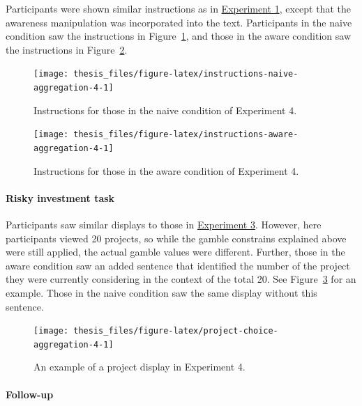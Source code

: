 \documentclass[a4paper, nobind, dvipsnames]{templates/ociamthesis}
\theoremstyle{definition}
\theoremstyle{definition}
\theoremstyle{definition}
\theoremstyle{definition}
\theoremstyle{remark}
\begin{document}
Participants were shown similar instructions as in
\protect\hyperlink{instructions-materials-aggregation-1}{Experiment 1}, except that the awareness
manipulation was incorporated into the text. Participants in the naive condition
saw the instructions in Figure~\ref{fig:instructions-naive-aggregation-4}, and
those in the aware condition saw the instructions in
Figure~\ref{fig:instructions-aware-aggregation-4}.



\begin{figure}
\texttt{[image: thesis\_files/figure-latex/instructions-naive-aggregation-4-1]} \caption{Instructions for those in the naive condition of Experiment 4.}\label{fig:instructions-naive-aggregation-4}
\end{figure}



\begin{figure}
\texttt{[image: thesis\_files/figure-latex/instructions-aware-aggregation-4-1]} \caption{Instructions for those in the aware condition of Experiment 4.}\label{fig:instructions-aware-aggregation-4}
\end{figure}

\hypertarget{risky-investment-task}{%
\paragraph{Risky investment task}\label{risky-investment-task}}

Participants saw similar displays to those in
\protect\hyperlink{task-aggregation-3}{Experiment 3}. However, here participants viewed 20
projects, so while the gamble constrains explained above were still applied, the
actual gamble values were different. Further, those in the aware condition saw
an added sentence that identified the number of the project they were currently
considering in the context of the total 20. See
Figure~\ref{fig:project-choice-aggregation-4} for an example. Those in the
naive condition saw the same display without this sentence.



\begin{figure}
\texttt{[image: thesis\_files/figure-latex/project-choice-aggregation-4-1]} \caption{An example of a project display in Experiment 4.}\label{fig:project-choice-aggregation-4}
\end{figure}

\hypertarget{follow-up-3}{%
\paragraph{Follow-up}\label{follow-up-3}}
\end{document}
